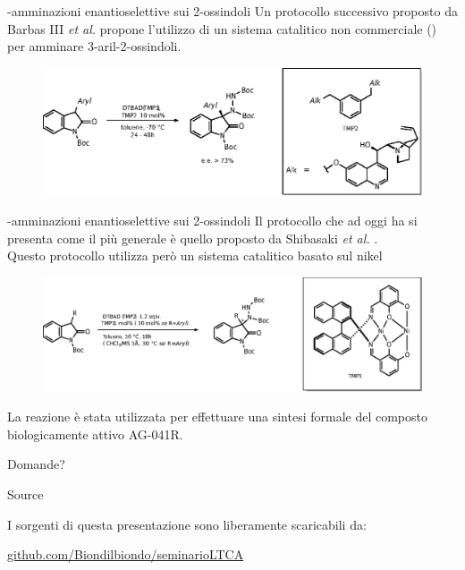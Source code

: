 \documentclass[10pt]{beamer}
\begin{document}
\begin{frame}[fragile]{{\textalpha}-amminazioni enantioselettive sui 2-ossindoli}
Un protocollo successivo proposto da Barbas III \textit{et al.}  propone l'utilizzo di un sistema catalitico non commerciale () per amminare \alert{3-aril-2-ossindoli}.
\begin{figure}[H] 
	\centering
	\includegraphics[scale=0.7]{P_barbas2oaaa.eps}
\end{figure} 
\end{frame}

\begin{frame}[fragile]{{\textalpha}-amminazioni enantioselettive sui 2-ossindoli}
Il protocollo che ad oggi ha si presenta come il più generale è quello proposto da Shibasaki \textit{et al.} .\\
Questo protocollo utilizza però un \alert{sistema catalitico basato sul nikel}
\begin{figure}[H] 
	\centering
	\includegraphics[scale=0.7]{P_shibasakioaaa.eps}
\end{figure} 
La reazione è stata utilizzata per effettuare una sintesi formale del composto biologicamente attivo \alert{AG-041R}.
\end{frame}


\begin{frame}[standout]
  Domande?
\end{frame}

\begin{frame}{Source}

\begin{center}
	I sorgenti di questa presentazione sono liberamente scaricabili da:
\end{center}

\begin{center}\url{github.com/Biondilbiondo/seminarioLTCA}\end{center}

\begin{center}\ccbysa\end{center}

\end{frame}

\appendix
\end{document}
